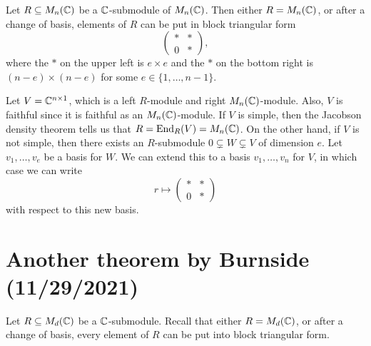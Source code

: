 \begin{prop}{}
    Let $R \subseteq M_n(\mathbb{C})$ be a $\mathbb{C}$-submodule of $M_n(\mathbb{C})$. Then either 
    $R = M_n(\mathbb{C})$, or after a change of basis, elements of $R$ can be 
    put in block triangular form 
    \[ \begin{pmatrix}
        * & * \\ 0 & * 
    \end{pmatrix}, \] 
    where the $*$ on the upper left is $e \times e$ and the $*$ on the 
    bottom right is $(n-e) \times (n-e)$ for some $e \in \{1, \dots, n-1\}$. 
\end{prop}
\begin{pf}
    Let $V = \mathbb{C}^{n\times 1}$, which is a left $R$-module and right 
    $M_n(\mathbb{C})$-module. Also, $V$ is faithful since it is faithful as an 
    $M_n(\mathbb{C})$-module. If $V$ is simple, then the Jacobson density theorem 
    tells us that $R = \operatorname{End}_R(V) = M_n(\mathbb{C})$. On the other hand, if $V$ 
    is not simple, then there exists an $R$-submodule $0 \subsetneq W 
    \subsetneq V$ of dimension $e$. Let $v_1, \dots, v_e$ be a basis for $W$. 
    We can extend this to a basis $v_1, \dots, v_n$ for $V$, in which 
    case we can write 
    \[ r \mapsto \begin{pmatrix}
        * & * \\ 0 & *
    \end{pmatrix} \] 
    with respect to this new basis. 
\end{pf}

\section{Another theorem by Burnside (11/29/2021)}
Let $R \subseteq M_d(\mathbb{C})$ be a $\mathbb{C}$-submodule. Recall that either $R = 
M_d(\mathbb{C})$, or after a change of basis, every element of $R$ can be 
put into block triangular form. 


